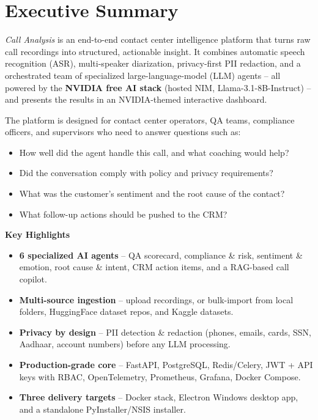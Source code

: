 \documentclass[11pt,a4paper]{article}
\begin{document}
\tableofcontents
\newpage

\section{Executive Summary}

\emph{Call Analysis} is an end-to-end contact center intelligence platform that turns raw
call recordings into structured, actionable insight. It combines automatic speech
recognition (ASR), multi-speaker diarization, privacy-first PII redaction, and a
orchestrated team of specialized large-language-model (LLM) agents -- all powered by
the \textbf{NVIDIA free AI stack} (hosted NIM, Llama-3.1-8B-Instruct) -- and presents
the results in an NVIDIA-themed interactive dashboard.

The platform is designed for contact center operators, QA teams, compliance officers,
and supervisors who need to answer questions such as:

\begin{itemize}
  \item How well did the agent handle this call, and what coaching would help?
  \item Did the conversation comply with policy and privacy requirements?
  \item What was the customer's sentiment and the root cause of the contact?
  \item What follow-up actions should be pushed to the CRM?
\end{itemize}

\begin{highlight}
\textbf{Key Highlights}
\begin{itemize}
  \item \textbf{6 specialized AI agents} -- QA scorecard, compliance \& risk, sentiment \&
        emotion, root cause \& intent, CRM action items, and a RAG-based call copilot.
  \item \textbf{Multi-source ingestion} -- upload recordings, or bulk-import from local
        folders, HuggingFace dataset repos, and Kaggle datasets.
  \item \textbf{Privacy by design} -- PII detection \& redaction (phones, emails, cards,
        SSN, Aadhaar, account numbers) before any LLM processing.
  \item \textbf{Production-grade core} -- FastAPI, PostgreSQL, Redis/Celery, JWT + API keys
        with RBAC, OpenTelemetry, Prometheus, Grafana, Docker Compose.
  \item \textbf{Three delivery targets} -- Docker stack, Electron Windows desktop app, and
        a standalone PyInstaller/NSIS installer.
\end{itemize}
\end{highlight}
\end{document}
